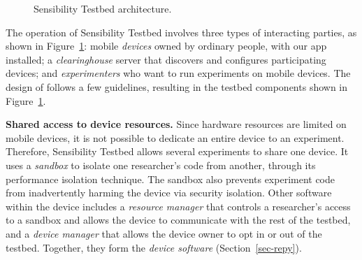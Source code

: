 \begin{figure}
\caption{\small Sensibility Testbed architecture. \label{fig-arch}}
\end{figure}

The operation of Sensibility Testbed  involves three types of interacting
parties, as shown in Figure~\ref{fig-arch}: mobile \textit{devices} 
owned by ordinary people, with our app installed; a 
\textit{clearinghouse} server that discovers and configures
participating devices; and \textit{experimenters} who want to run
experiments on mobile devices. The design of \sysname follows
a few guidelines, resulting in the testbed components
shown in Figure~\ref{fig-arch}.

\textbf{Shared access to device resources.} 
Since hardware resources are limited on mobile devices, it is 
not possible to dedicate an entire device to an experiment. Therefore, 
Sensibility Testbed allows several experiments to share one device. It 
uses a \textit{sandbox} to isolate one researcher's code from 
 another, through its performance isolation technique. The sandbox 
also prevents experiment code from inadvertently harming the device
via security isolation. Other software within the device includes a 
\textit{resource manager} that controls a researcher's access to a sandbox 
and allows the device to communicate with the rest of the testbed, 
and a \textit{device manager} that allows the device 
owner to opt in or out of the testbed. Together, they form the
\textit{device software} (Section~\ref{sec-repy}).

